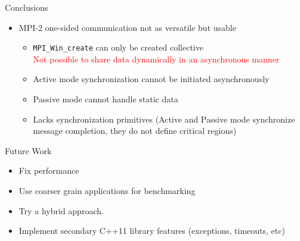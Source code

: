 \documentclass[svgnames]{beamer}
\begin{document}
\begin{frame}{Conclusions}
\begin{itemize}
	\item MPI-2 one-sided communication not as versatile but usable
	\begin{itemize}
		\item \texttt{MPI\_Win\_create} can only be created collective\\
					\textcolor{red}{Not possible to share data dynamically in an asynchronous manner}
		\item Active mode synchronization cannot be initiated asynchronously
		\item Passive mode cannot handle static data
		\item Lacks synchronization primitives (Active and Passive mode synchronize message completion, they do not define
					critical regions)
	\end{itemize}
\end{itemize}
\end{frame}

\begin{frame}{Future Work}
\begin{itemize}
	\item Fix performance
	\item Use coarser grain applications for benchmarking
	\item Try a hybrid approach.
	\item Implement secondary C++11 library features (exceptions, timeouts, etc)
\end{itemize}
\end{frame}
\end{document}
